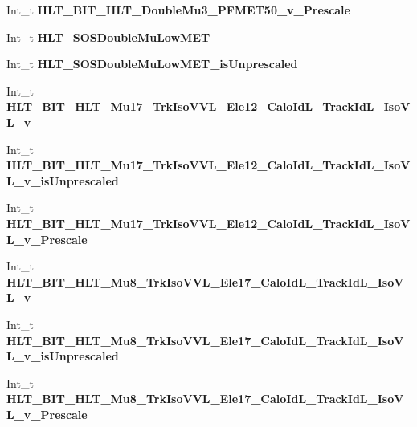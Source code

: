 \begin{DoxyCompactItemize}
Int\+\_\+t {\bfseries H\+L\+T\+\_\+\+B\+I\+T\+\_\+\+H\+L\+T\+\_\+\+Double\+Mu3\+\_\+\+P\+F\+M\+E\+T50\+\_\+v\+\_\+\+Prescale}
\item 
\hypertarget{classMiniTree_a851fc9559e871adeeed8495df7a92277}{}\label{classMiniTree_a851fc9559e871adeeed8495df7a92277} 
Int\+\_\+t {\bfseries H\+L\+T\+\_\+\+S\+O\+S\+Double\+Mu\+Low\+M\+ET}
\item 
\hypertarget{classMiniTree_a6d9a3c968eb225aca01acec181cadcd3}{}\label{classMiniTree_a6d9a3c968eb225aca01acec181cadcd3} 
Int\+\_\+t {\bfseries H\+L\+T\+\_\+\+S\+O\+S\+Double\+Mu\+Low\+M\+E\+T\+\_\+is\+Unprescaled}
\item 
\hypertarget{classMiniTree_a0f29fddd578311fdf36b7c10476bb48e}{}\label{classMiniTree_a0f29fddd578311fdf36b7c10476bb48e} 
Int\+\_\+t {\bfseries H\+L\+T\+\_\+\+B\+I\+T\+\_\+\+H\+L\+T\+\_\+\+Mu17\+\_\+\+Trk\+Iso\+V\+V\+L\+\_\+\+Ele12\+\_\+\+Calo\+Id\+L\+\_\+\+Track\+Id\+L\+\_\+\+Iso\+V\+L\+\_\+v}
\item 
\hypertarget{classMiniTree_a6a9ca0f545dfe781a6b40bc64961e388}{}\label{classMiniTree_a6a9ca0f545dfe781a6b40bc64961e388} 
Int\+\_\+t {\bfseries H\+L\+T\+\_\+\+B\+I\+T\+\_\+\+H\+L\+T\+\_\+\+Mu17\+\_\+\+Trk\+Iso\+V\+V\+L\+\_\+\+Ele12\+\_\+\+Calo\+Id\+L\+\_\+\+Track\+Id\+L\+\_\+\+Iso\+V\+L\+\_\+v\+\_\+is\+Unprescaled}
\item 
\hypertarget{classMiniTree_a44ad38ff2a8cc653b5a56d6623b074da}{}\label{classMiniTree_a44ad38ff2a8cc653b5a56d6623b074da} 
Int\+\_\+t {\bfseries H\+L\+T\+\_\+\+B\+I\+T\+\_\+\+H\+L\+T\+\_\+\+Mu17\+\_\+\+Trk\+Iso\+V\+V\+L\+\_\+\+Ele12\+\_\+\+Calo\+Id\+L\+\_\+\+Track\+Id\+L\+\_\+\+Iso\+V\+L\+\_\+v\+\_\+\+Prescale}
\item 
\hypertarget{classMiniTree_a0a8fe939d19d882dc7c3de7bebfcca86}{}\label{classMiniTree_a0a8fe939d19d882dc7c3de7bebfcca86} 
Int\+\_\+t {\bfseries H\+L\+T\+\_\+\+B\+I\+T\+\_\+\+H\+L\+T\+\_\+\+Mu8\+\_\+\+Trk\+Iso\+V\+V\+L\+\_\+\+Ele17\+\_\+\+Calo\+Id\+L\+\_\+\+Track\+Id\+L\+\_\+\+Iso\+V\+L\+\_\+v}
\item 
\hypertarget{classMiniTree_a2c3be9ee134975d9575ea2080930f8ca}{}\label{classMiniTree_a2c3be9ee134975d9575ea2080930f8ca} 
Int\+\_\+t {\bfseries H\+L\+T\+\_\+\+B\+I\+T\+\_\+\+H\+L\+T\+\_\+\+Mu8\+\_\+\+Trk\+Iso\+V\+V\+L\+\_\+\+Ele17\+\_\+\+Calo\+Id\+L\+\_\+\+Track\+Id\+L\+\_\+\+Iso\+V\+L\+\_\+v\+\_\+is\+Unprescaled}
\item 
\hypertarget{classMiniTree_a2bb0e0ea8cbc96e11ae32a055529173a}{}\label{classMiniTree_a2bb0e0ea8cbc96e11ae32a055529173a} 
Int\+\_\+t {\bfseries H\+L\+T\+\_\+\+B\+I\+T\+\_\+\+H\+L\+T\+\_\+\+Mu8\+\_\+\+Trk\+Iso\+V\+V\+L\+\_\+\+Ele17\+\_\+\+Calo\+Id\+L\+\_\+\+Track\+Id\+L\+\_\+\+Iso\+V\+L\+\_\+v\+\_\+\+Prescale}

\end{DoxyCompactItemize}
